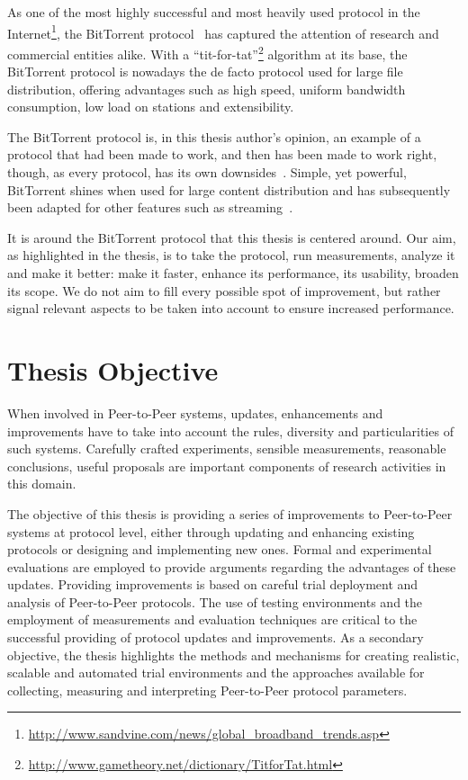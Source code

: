 As one of the most highly successful and most heavily used protocol in the
Internet\footnote{\url{http://www.sandvine.com/news/global\_broadband\_trends.asp}},
the BitTorrent protocol~\cite{bittorrent-cohen} has captured the
attention of research and commercial entities alike. With a
``tit-for-tat''\footnote{\url{http://www.gametheory.net/dictionary/TitforTat.html}} algorithm at its base, the BitTorrent protocol
is nowadays the de facto protocol used for large file distribution, offering
advantages such as high speed, uniform bandwidth consumption, low load on
stations and extensibility.

The BitTorrent protocol is, in this thesis author's opinion, an example of a
protocol that had been made to work, and then has been made to work right,
though, as every protocol, has its own downsides~\cite{bittorrent-trade-offs}.
Simple, yet powerful, BitTorrent shines when used for large content
distribution and has subsequently been adapted for other features such as
streaming~\cite{bittorrent-streaming}.

It is around the BitTorrent protocol that this thesis is centered around. Our
aim, as highlighted in the thesis, is to take the protocol, run measurements,
analyze it and make it better: make it faster, enhance its performance, its
usability, broaden its scope. We do not aim to fill every possible spot of
improvement, but rather signal relevant aspects to be taken into account to
ensure increased performance.

\section{Thesis Objective}
\label{sec:intro:objective}

When involved in Peer-to-Peer systems, updates, enhancements and improvements
have to take into account the rules, diversity and particularities of such
systems. Carefully crafted experiments, sensible measurements, reasonable
conclusions, useful proposals are important components of research activities
in this domain.

The objective of this thesis is providing a series of improvements to
Peer-to-Peer systems at protocol level, either through updating and enhancing
existing protocols or designing and implementing new ones. Formal and
experimental evaluations are employed to provide arguments regarding the
advantages of these updates. Providing improvements is based on careful
trial deployment and analysis of Peer-to-Peer protocols. The use of testing
environments and the employment of measurements and evaluation techniques are
critical to the successful providing of protocol updates and improvements. As
a secondary objective, the thesis highlights the methods and mechanisms for
creating realistic, scalable and automated trial environments and the
approaches available for collecting, measuring and interpreting Peer-to-Peer
protocol parameters.

